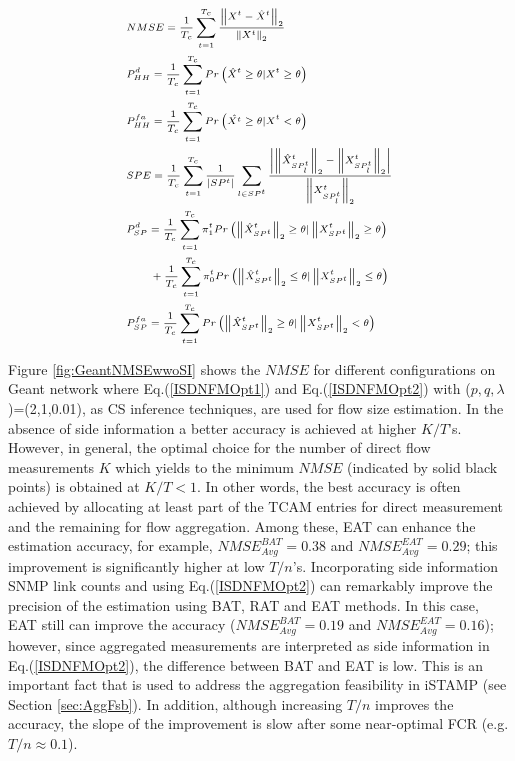 \begin{equation} \label{NMSEPdPfaHH}
\scriptsize{
\begin{aligned}
& NMSE=\frac{1}{T_{c}} \sum_{t=1}^{T_{c}}  \frac{\left\|X^{t}-\hat{X}^{t}\right\|_{2}}{\left\|X^{t}\right\|_{2}} \\
& P_{HH}^{d} = \frac{1}{T_{c}} \sum_{t=1}^{T_{c}} Pr\left( \hat{X}^{t} \geq \theta | X^{t} \geq \theta \right) \\
& P_{HH}^{fa} = \frac{1}{T_{c}} \sum_{t=1}^{T_{c}}  Pr\left( \hat{X^{t}} \geq \theta | X^{t} < \theta \right) \\
& SPE =\frac{1}{T_{c}}  \sum_{t=1}^{T_{c}} \frac{1}{\left|SP^{t}\right|} \sum_{l \in SP^{t}} \frac{ \left| \left\|\hat{X}_{SP^{t}_{l}}^{t}\right\|_{2}-\left\|X_{SP^{t}_{l}}^{t}\right\|_{2} \right|}{\left\|X_{SP^{t}_{l}}^{t}\right\|_{2}} \\
& P_{SP}^{d} = \frac{1}{T_{c}} \sum_{t=1}^{T_{c}} \pi_{1}^{t} Pr\left( \left\|\hat{X}_{SP^{t}}^{t} \right\|_{2} \geq \theta | \left\|X_{SP^{t}}^{t} \right\|_{2} \geq \theta \right) \\
& \hspace{0.6cm} + \frac{1}{T_{c}} \sum_{t=1}^{T_{c}} \pi_{0}^{t} Pr\left( \left\|\hat{X}_{SP^{t}}^{t} \right\|_{2} \leq \theta | \left\|X_{SP^{t}}^{t} \right\|_{2} \leq \theta \right)  \\
& P_{SP}^{fa} = \frac{1}{T_{c}} \sum_{t=1}^{T_{c}} Pr\left( \left\|\hat{X}_{SP^{t}}^{t} \right\|_{2} \geq \theta | \left\|X_{SP^{t}}^{t} \right\|_{2} < \theta \right)
\end{aligned}
}
\end{equation}

Figure \ref{fig:GeantNMSEwwoSI} shows the $NMSE$ for different configurations on Geant network where Eq.(\ref{ISDNFMOpt1}) and Eq.(\ref{ISDNFMOpt2}) with ($p,q,\lambda$)=(2,1,0.01), as CS inference techniques, are used for flow size estimation. In the absence of side information a better accuracy is achieved at higher $K/T$'s.  However, in general, the optimal choice for the number of direct flow measurements $K$ which yields to the minimum $NMSE$ (indicated by solid black points) is obtained at $K/T<1$. In other words, the best accuracy is often achieved by allocating at least part of the TCAM entries for direct measurement and the remaining for flow aggregation. Among these, EAT can  enhance the estimation accuracy, for example, $NMSE_{Avg}^{BAT}=0.38$ and $NMSE_{Avg}^{EAT}=0.29$; this improvement is significantly higher at low $T/n$'s. Incorporating side information SNMP link counts and using Eq.(\ref{ISDNFMOpt2}) can remarkably improve the precision of the estimation using BAT, RAT and EAT methods. In this case, EAT still can improve the accuracy ($NMSE_{Avg}^{BAT}=0.19$ and $NMSE_{Avg}^{EAT}=0.16$); however, since aggregated measurements are interpreted as side information in Eq.(\ref{ISDNFMOpt2}), the difference between BAT and EAT is low. This is an important fact that is used to address the aggregation feasibility in iSTAMP (see Section \ref{sec:AggFsb}). In addition, although increasing $T/n$ improves the accuracy, the slope of the improvement is slow after some near-optimal FCR (e.g. $T/n \approx 0.1$). 


